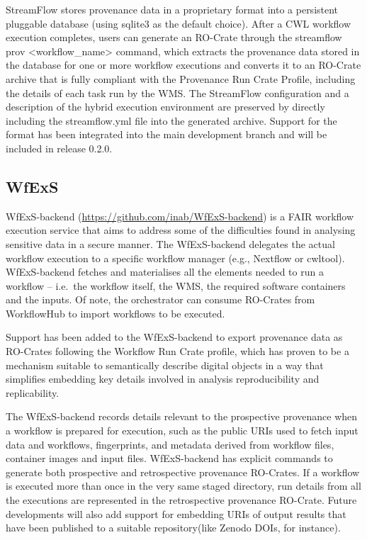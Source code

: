 \documentclass[10pt,letterpaper]{article}
\begin{document}
StreamFlow stores provenance data in a proprietary format into a persistent pluggable database (using sqlite3 as the default choice).
After a CWL workflow execution completes, users can generate an RO-Crate through the streamflow prov \textless workflow\_name\textgreater{}
command, which extracts the provenance data stored in the database for one or more workflow executions and converts it to an RO-Crate archive that is fully compliant with the Provenance Run Crate Profile, including the details of each task run by the WMS.
The StreamFlow configuration and a description of the hybrid execution environment are preserved by directly including the streamflow.yml file into the generated archive.
Support for the format has been integrated into the main development branch and will be included in release 0.2.0.

\subsection{WfExS}\label{wfexs}

WfExS-backend (\url{https://github.com/inab/WfExS-backend}) is a FAIR workflow execution service that aims to address some of the difficulties found in analysing sensitive data in a secure manner.
The WfExS-backend delegates the actual workflow execution to a specific workflow manager (e.g., Nextflow or cwltool).
WfExS-backend fetches and materialises all the elements needed to run a workflow -- i.e.~the workflow itself, the WMS, the required software containers and the inputs.
Of note, the orchestrator can consume RO-Crates from WorkflowHub to import workflows to be executed.

Support has been added to the WfExS-backend to export provenance data as RO-Crates following the Workflow Run Crate profile, which has proven to be a mechanism suitable to semantically describe digital objects in a way that simplifies embedding key details involved in analysis reproducibility and replicability.

The WfExS-backend records details relevant to the prospective provenance when a workflow is prepared for execution, such as the public URIs used to fetch input data and workflows, fingerprints, and metadata derived from workflow files, container images and input files.
WfExS-backend has explicit commands to generate both prospective and retrospective provenance RO-Crates.
If a workflow is executed more than once in the very same staged directory, run details from all the executions are represented in the retrospective provenance RO-Crate.
Future developments will also add support for embedding URIs of output results that have been published to a suitable repository(like Zenodo DOIs, for instance).
\end{document}
